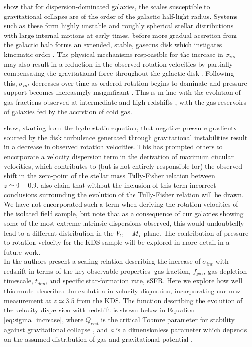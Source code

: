 \documentclass[fleqn,usenatbib]{mnras}
\begin{document}
\cite{Genzel2011} show that for dispersion-dominated galaxies, the scales susceptible to gravitational collapse are of the order of the galactic half-light radius. 
Systems such as these form highly unstable and roughly spherical stellar distributions with large internal motions at early times, before more gradual accretion from the galactic halo forms an extended, stable, gaseous disk which instigates kinematic order \citep{Law2009,Genzel2011}.
The physical mechanisms responsible for the increase in $\sigma_{int}$ may also result in a reduction in the observed rotation velocities by partially compensating the gravitational force throughout the galactic disk \citep[e.g.][]{Burkert2010,Wuyts2016b,Ubler2017,Genzel2017,Lang2017}.
Following this, $\sigma_{int}$ decreases over time as ordered rotation begins to dominate and pressure support becomes increasingly insignificant \citep[e.g.][]{Burkert2010,Ubler2017,Genzel2017,Lang2017}.
This is in line with the evolution of gas fractions observed at intermediate and high-redshifts \citep[e.g.][]{Saintonge2013,Tacconi2013,Tacconi2017}, with the gas reservoirs of galaxies fed by the accretion of cold gas.


\cite{Burkert2010} show, starting from the hydrostatic equation, that negative pressure gradients sourced by the disk turbulence generated through gravitational instabilities result in a decrease in observed rotation velocities. 
This has prompted others \citep[e.g.][]{Wuyts2016b,Ubler2017,Lang2017} to encorporate a velocity dispersion term in the derivation of maximum circular velocities, which contributes to (but is not entirely responsible for) the observed shift in the zero-point of the stellar mass Tully-Fisher relation between $z\simeq0-0.9$.
\cite{Ubler2017} also claim that without the inclusion of this term incorrect conclusions surrounding the evolution of the Tully-Fisher relation will be drawn.
We have not encorporated such a term when deriving the rotation velocities of the isolated field sample, but note that as a consequence of our galaxies showing some of the most extreme intrinsic dispersions observed, this would undoubtedly lead to a different distribution in the $V_{C}-M_{\star}$ plane.
The contribution of pressure to rotation velocity for the KDS sample will be explored in more detail in a future work. 
\\


In \cite{Wisnioski2015} the authors present a scaling relation describing the increase of $\sigma_{int}$ with redshift in terms of the key observable properties: gas fraction, $f_{gas}$, gas depletion timescale, $t_{dep}$, and specific star-formation rate, sSFR.
Here we explore how well this model describes the evolution in velocity dispersion, incorporating our new measurement at $z\simeq3.5$ from the KDS.
The function describing the evolution of the velocity dispersion with redshift is shown below in Equation \ref{eq:sigma_increase}, where $Q_{crit}$ is the critical Toomre parameter for stability against gravitational collapse \citep{Toomre1964}, and {\it a} is a dimensionless parameter which depends on the assumed distribution of gas and gravitational potential \cite{ForsterSchreiber2006}. 
\end{document}
